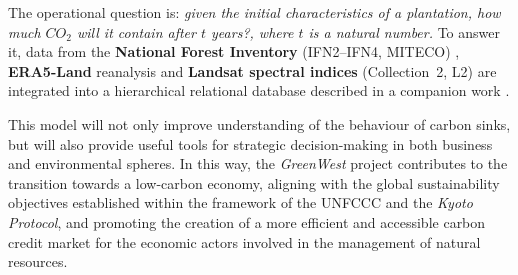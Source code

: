 The operational question is: \emph{given the initial characteristics of a plantation, how much \(CO_2\) will it contain after \(t\) years?, where \(t\) is a natural number.} To answer it, data from the \textbf{National Forest Inventory} (IFN2--IFN4, MITECO) \cite{ifn}, \textbf{ERA5-Land} reanalysis \cite{era5land} and \textbf{Landsat spectral indices} (Collection~2, L2) \cite{landsatc2} are integrated into a hierarchical relational database described in a companion work \cite{greenwestdb}.

This model will not only improve understanding of the behaviour of carbon sinks, but will also provide useful tools for strategic decision-making in both business and environmental spheres. In this way, the \textit{GreenWest} project contributes to the transition towards a low-carbon economy, aligning with the global sustainability objectives established within the framework of the UNFCCC and the \textit{Kyoto Protocol}, and promoting the creation of a more efficient and accessible carbon credit market for the economic actors involved in the management of natural resources.


